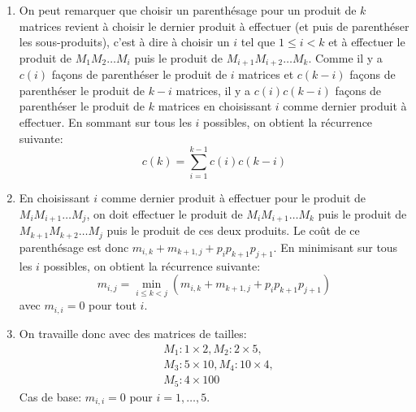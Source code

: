 {\begin{td-sol}[]
\begin{enumerate}
			\item On peut remarquer que choisir un parenthésage pour un produit de \(k\) matrices revient à choisir le dernier produit à effectuer (et puis de parenthéser les sous-produits), c'est à dire à choisir un \(i\) tel que \(1 \leq i < k\) et à effectuer le produit de \(M_1 M_2 \ldots M_i\) puis le produit de \(M_{i + 1} M_{i + 2} \ldots M_k\).
			Comme il y a \(c(i)\) façons de parenthéser le produit de \(i\) matrices et \(c(k - i)\) façons de parenthéser le produit de \(k - i\) matrices, il y a \(c(i) c(k - i)\) façons de parenthéser le produit de \(k\) matrices en choisissant \(i\) comme dernier produit à effectuer.
			En sommant sur tous les \(i\) possibles, on obtient la récurrence suivante:
			\begin{equation*}
				c(k) = \sum_{i = 1}^{k - 1} c(i) c(k - i)
			\end{equation*}
			
			\item En choisissant \(i\) comme dernier produit à effectuer pour le produit de \(M_i M_{i + 1} \ldots M_j\), on doit effectuer le produit de \(M_i M_{i + 1} \ldots M_k\) puis le produit de \(M_{k + 1} M_{k + 2} \ldots M_j\) puis le produit de ces deux produits.
			Le coût de ce parenthésage est donc \(m_{i, k} + m_{k + 1, j} + p_i p_{k + 1} p_{j + 1}\).
			En minimisant sur tous les \(i\) possibles, on obtient la récurrence suivante:
			\begin{equation*}
				m_{i, j} = \min_{i \leq k < j} \left( m_{i, k} + m_{k + 1, j} + p_i p_{k + 1} p_{j + 1} \right)
			\end{equation*}
			avec \(m_{i, i} = 0\) pour tout \(i\).

			\item On travaille donc avec des matrices de tailles:
			\begin{equation*}
				\begin{aligned}
					&M_1: 1 \times 2, M_2: 2 \times 5,\\
					&M_3: 5 \times 10, M_4: 10 \times 4,\\
					&M_5: 4 \times 100
				\end{aligned}
			\end{equation*}
			Cas de base: \(m_{i, i} = 0\) pour \(i = 1, \ldots, 5\).
			

\end{enumerate}
\end{td-sol}}
